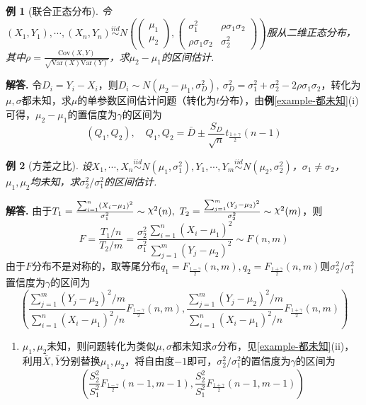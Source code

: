 \documentclass[12pt, a4paper, oneside]{ctexart}
\newtheorem{example}{例}[section]  %
\numberwithin{equation}{section}  %
\newenvironment{solution}[1][]{\par\noindent\textbf{#1解答. }}{\smallskip\par}  %
\newenvironment{remark}{\begin{enumerate}[label=\textbf{注\arabic*.}]}{\end{enumerate}}
\DeclareRobustCommand{\rchi}{{\mathpalette\irchi\relax}}
\newcommand{\irchi}[2]{\raisebox{\depth}{$#1\chi$}} %
\def\var{\text{Var}}        %
\def\cov{\text{Cov}}        %
\def\del{\vspace{-1.5ex}}   %
\begin{document}
\begin{example}[联合正态分布]
    令$(X_1,Y_1),\cdots, (X_n,Y_n)\overset{iid}{\sim} N\left(\left(\begin{matrix}
        \mu_1\\ \mu_2
    \end{matrix}\right),\left(\begin{matrix}
        \sigma_1^2&\rho\sigma_1\sigma_2\\
        \rho\sigma_1\sigma_2&\sigma_2^2
    \end{matrix}\right)\right)$服从二维正态分布，其中$\rho = \frac{\cov(X,Y)}{\sqrt{\var(X)\var(Y)}}$，求$\mu_2-\mu_1$的区间估计.
\end{example}
\begin{solution}
    令$D_i = Y_i-X_i$，则$D_i\sim N(\mu_2-\mu_1, \sigma_D^2),\ \sigma_D^2 = \sigma_1^2+\sigma_2^2-2\rho\sigma_1\sigma_2$，转化为$\mu,\sigma$都未知，求$\mu$的单参数区间估计问题（转化为$t$分布），由\textbf{例}\ref{example-都未知}(i)可得，$\mu_2-\mu_1$的置信度为$\gamma$的区间为
    \begin{equation*}
        (Q_1,Q_2),\quad Q_1,Q_2 = \bar{D}\pm \frac{S_D}{\sqrt{n}}t_{\frac{1+\gamma}{2}}(n-1)
    \end{equation*}\del
\end{solution}
\begin{example}[方差之比]
    设$X_1,\cdots,X_n\overset{iid}{\sim}N(\mu_1,\sigma_1^2),Y_1,\cdots,Y_m\overset{iid}{\sim}N(\mu_2,\sigma_2^2)$，$\sigma_1\neq\sigma_2$，$\mu_1,\mu_2$均未知，求$\sigma_2^2/\sigma_1^2$的区间估计.
\end{example}
\begin{solution}
    由于$T_1 = \frac{\sum_{i=1}^n(X_i-\mu_1)^2}{\sigma_1^2}\sim\rchi^2(n),\ T_2 = \frac{\sum_{j=1}^m(Y_j-\mu_2)^2}{\sigma_2^2}\sim\rchi^2(m)$，则
    \begin{equation*}
        F = \frac{T_1/n}{T_2/m} = \frac{\sigma_2^2}{\sigma_1^2}\frac{\sum_{i=1}^n(X_i-\mu_1)^2}{\sum_{j=1}^m(Y_j-\mu_2)^2}\sim F(n,m)
    \end{equation*}
    由于$F$分布不是对称的，取等尾分布$q_1=F_{\frac{1-\gamma}{2}}(n,m),q_2=F_{\frac{1+\gamma}{2}}(n,m)$则$\sigma_2^2/\sigma_1^2$置信度为$\gamma$的区间为
    \begin{equation*}
        \left(\frac{\sum_{j=1}^m(Y_j-\mu_2)^2/m}{\sum_{i=1}^n(X_i-\mu_1)^2/n}F_{\frac{1-\gamma}{2}}(n,m),\frac{\sum_{j=1}^m(Y_j-\mu_2)^2/m}{\sum_{i=1}^n(X_i-\mu_1)^2/n}F_{\frac{1+\gamma}{2}}(n,m)
\right)
    \end{equation*}
    \begin{remark}
        \item $\mu_1,\mu_2$未知，则问题转化为类似$\mu,\sigma$都未知求$\sigma$分布，见\ref{example-都未知}(ii)，利用$\bar{X},\bar{Y}$分别替换$\mu_1,\mu_2$，将自由度$-1$即可，$\sigma_2^2/\sigma_1^2$的置信度为$\gamma$的区间为
        \begin{equation*}
            \left(\frac{S_2^2}{S_1^2}F_{\frac{1-\gamma}{2}}(n-1,m-1), \frac{S_2^2}{S_1^2}F_{\frac{1+\gamma}{2}}(n-1,m-1)\right)
        \end{equation*}
    \end{remark}
\end{solution}
\end{document}
